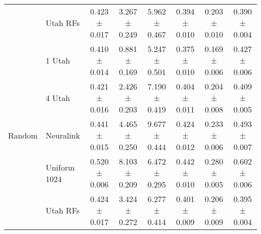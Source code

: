 \begin{table}
\begin{tabular}{llcccccc}
 & Utah RFs & 0.423 ± 0.017 & 3.267 ± 0.249 & 5.962 ± 0.467 & 0.394 ± 0.010 & 0.203 ± 0.010 & 0.390 ± 0.004 \\
\cline{1-8}
\multirow[t]{5}{*}{Random} & 1 Utah & 0.410 ± 0.014 & 0.881 ± 0.169 & 5.247 ± 0.501 & 0.375 ± 0.010 & 0.169 ± 0.006 & 0.427 ± 0.006 \\
 & 4 Utah & 0.421 ± 0.016 & 2.426 ± 0.203 & 7.190 ± 0.419 & 0.404 ± 0.011 & 0.204 ± 0.008 & 0.409 ± 0.005 \\
 & Neuralink & 0.441 ± 0.015 & 4.465 ± 0.250 & 9.677 ± 0.444 & 0.424 ± 0.012 & 0.233 ± 0.006 & 0.493 ± 0.007 \\
 & Uniform 1024 & 0.520 ± 0.006 & 8.103 ± 0.209 & 6.472 ± 0.295 & 0.442 ± 0.010 & 0.280 ± 0.005 & 0.602 ± 0.006 \\
 & Utah RFs & 0.424 ± 0.017 & 3.424 ± 0.272 & 6.277 ± 0.414 & 0.401 ± 0.009 & 0.206 ± 0.009 & 0.395 ± 0.004 \\
\cline{1-8}
\bottomrule
\end{tabular}
\end{table}
